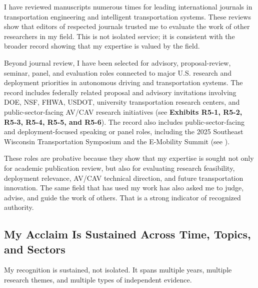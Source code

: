 \documentclass[11pt,letterpaper]{article}
\begin{document}
I have reviewed manuscripts numerous times for leading international journals in transportation engineering and intelligent transportation systems. These reviews show that editors of respected journals trusted me to evaluate the work of other researchers in my field. This is not isolated service; it is consistent with the broader record showing that my expertise is valued by the field.

Beyond journal review, I have been selected for advisory, proposal-review, seminar, panel, and evaluation roles connected to major U.S. research and deployment priorities in autonomous driving and transportation systems. The record includes federally related proposal and advisory invitations involving DOE, NSF, FHWA, USDOT, university transportation research centers, and public-sector-facing AV/CAV research initiatives (see \textbf{Exhibits R5-1, R5-2, R5-3, R5-4, R5-5, and R5-6}). The record also includes public-sector-facing and deployment-focused speaking or panel roles, including the 2025 Southeast Wisconsin Transportation Symposium and the E-Mobility Summit (see ).

These roles are probative because they show that my expertise is sought not only for academic publication review, but also for evaluating research feasibility, deployment relevance, AV/CAV technical direction, and future transportation innovation. The same field that has used my work has also asked me to judge, advise, and guide the work of others. That is a strong indicator of recognized authority.

\subsection{My Acclaim Is Sustained Across Time, Topics, and Sectors}

My recognition is sustained, not isolated. It spans multiple years, multiple research themes, and multiple types of independent evidence.
\end{document}
